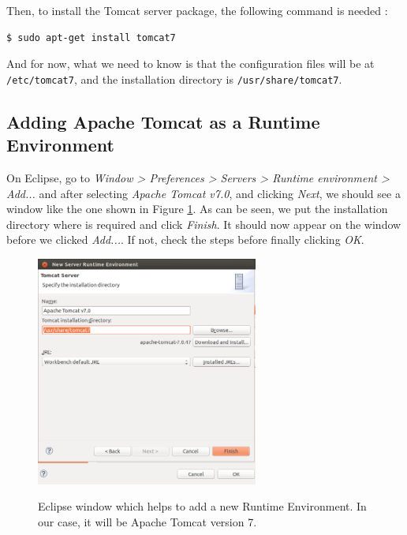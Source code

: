 Then, to install the Tomcat server package, the following command is needed \cite{tomcatdocu:site}:

\begin{verbatim}
$ sudo apt-get install tomcat7
\end{verbatim}

And for now, what we need to know is that the configuration files will be at \texttt{/etc/tomcat7}, and the installation directory is \texttt{/usr/share/tomcat7}.

\subsection{Adding Apache Tomcat as a Runtime Environment}
\label{subsec:apacheSRE}

On Eclipse, go to \textit{Window > Preferences > Servers > Runtime environment > Add...} and after selecting \textit{Apache Tomcat v7.0}, and clicking \textit{Next}, we should see a window like the one shown in Figure \ref{fig:addingSRE}. As can be seen, we put the installation directory where is required and click \textit{Finish}. It should now appear on the window before we clicked \textit{Add...}. If not, check the steps before finally clicking \textit{OK}.

\begin{figure}
  \begin{center}
    \includegraphics[width=0.65\textwidth]{./Figures/addingSRE.png}
    \label{fig:addingSRE}
    \caption{Eclipse window which helps to add a new Runtime Environment. In our case, it will be Apache Tomcat version 7.}
  \end{center}
\end{figure}

